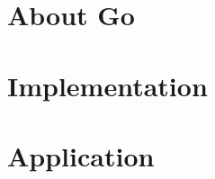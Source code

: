 \documentclass[%
  a4paper,
  twoside,
  numbers=noenddot,
  parskip=half+,
  open=any,
  headsepline,
  english, %
  ba  %
]{zhawthesis}
\begin{document}
\chapter{About Go}
\label{ch:about-go}


%

\label{ch:methodology} %


\chapter{Implementation}
\label{ch:implementation} %


\chapter{Application}
\label{ch:application} %


\label{ch:results} %


\label{ch:discussion} %

\end{document}
